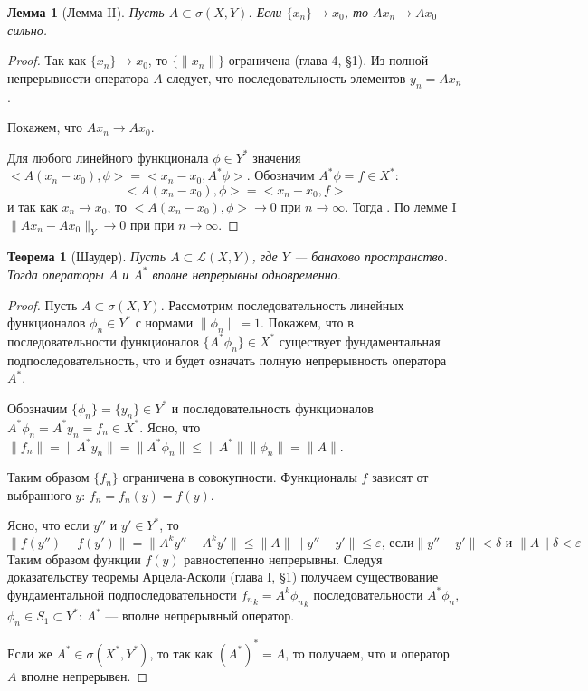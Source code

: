 \documentclass[12pt,a4paper,titlepage,oneside]{book}
\theoremstyle{definition}
\theoremstyle{plain}
\newtheorem*{theorem}{Теорема}
\theoremstyle{remark}
\theoremstyle{remark}
\theoremstyle{remark}
\theoremstyle{remark}
\theoremstyle{plain}
\newtheorem*{lemma}{Лемма}
\theoremstyle{plain}
\begin{document}
\begin{lemma}[Лемма II]
Пусть $A\subset\sigma(X,Y)$. Если $\{x_n\}\to x_0$, то $Ax_n\to Ax_0$ сильно.
\end{lemma}

\begin{proof}
Так как $\{x_n\}\to x_0$, то $\{\lVert x_n\rVert\}$ ограничена (глава 4, \S 1). Из полной непрерывности оператора $A$ следует, что последовательность элементов $y_n = Ax_n$ .

Покажем, что $Ax_n\to Ax_0$.

Для любого линейного функционала $\phi\in Y^*$ значения $<A(x_n-x_0), \phi> = <x_n-x_0, A^*\phi>$. Обозначим $A^*\phi = f\in X^*$:
\begin{equation*}
<A(x_n-x_0), \phi> = <x_n-x_0, f>
\end{equation*}
и так как $x_n\to x_0$, то $<A(x_n-x_0), \phi>\to 0$ при $n\to\infty$. Тогда . По лемме I $\lVert Ax_n-Ax_0\rVert_Y\to 0$ при при $n\to\infty$.
\end{proof}

\begin{theorem}[Шаудер]
Пусть $A\subset\mathcal{L}(X, Y)$, где $Y$ --- банахово пространство. Тогда операторы $A$ и $A^*$ вполне непрерывны одновременно.
\end{theorem}

\begin{proof}
Пусть $A\subset\sigma(X, Y)$. Рассмотрим последовательность линейных функционалов $\phi_n\in Y^*$ с нормами $\lVert \phi_n\rVert = 1$. Покажем, что в последовательности функционалов $\{A^*\phi_n\}\in X^*$ существует фундаментальная подпоследовательность, что и будет означать полную непрерывность оператора $A^*$.

Обозначим $\{\phi_n\} = \{y_n\}\in Y^*$ и последовательность функционалов $A^*\phi_n = A^*y_n = f_n\in X^*$. Ясно, что $\lVert f_n\rVert = \lVert A^*y_n\rVert = \lVert A^*\phi_n\rVert \le \lVert A^*\rVert\lVert \phi_n\rVert = \lVert A\rVert$.

Таким образом $\{f_n\}$ ограничена в совокупности. Функционалы $f$ зависят от выбранного $y$: $f_n = f_n(y) = f(y)$.

Ясно, что если $y''$ и $y'\in Y^*$, то
\begin{equation*}
\lVert f(y'')-f(y')\rVert = \lVert A^ky''-A^ky'\rVert\le\lVert A\rVert\lVert y''-y'\rVert\le\varepsilon\mbox{, если} \lVert y''-y'\rVert < \delta\mbox{ и }\lVert A\rVert\delta < \varepsilon
\end{equation*}
Таким образом функции $f(y)$ равностепенно непрерывны. Следуя доказательству теоремы Арцела-Асколи (глава I, \S 1) получаем существование фундаментальной подпоследовательности ${f_n}_k = A^k{\phi_n}_k$ последовательности $A^*\phi_n$, $\phi_n\in S_1\subset Y^*$: $A^*$ --- вполне непрерывный оператор.

Если же $A^*\in\sigma(X^*,Y^*)$, то так как $(A^*)^* = A$, то получаем, что и оператор $A$ вполне непрерывен.
\end{proof}
\end{document}
